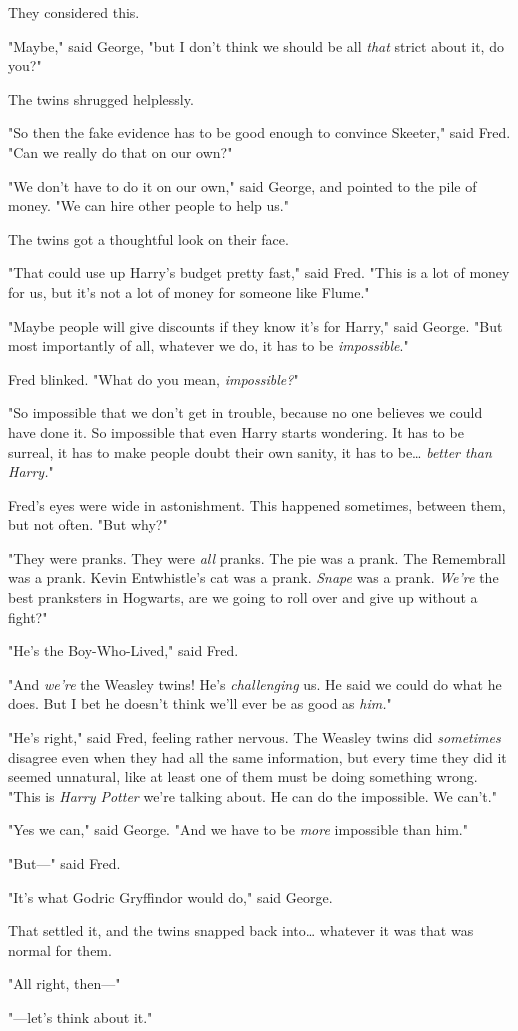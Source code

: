 They considered this.

"Maybe," said George, "but I don't think we should be all \emph{that} strict
about it, do you?"

The twins shrugged helplessly.

"So then the fake evidence has to be good enough to convince Skeeter," said
Fred. "Can we really do that on our own?"

"We don't have to do it on our own," said George, and pointed to the pile of
money. "We can hire other people to help us."

The twins got a thoughtful look on their face.

"That could use up Harry's budget pretty fast," said Fred. "This is a lot of
money for us, but it's not a lot of money for someone like Flume."

"Maybe people will give discounts if they know it's for Harry," said George.
"But most importantly of all, whatever we do, it has to be \emph{impossible}."

Fred blinked. "What do you mean, \emph{impossible?}"

"So impossible that we don't get in trouble, because no one believes we could
have done it. So impossible that even Harry starts wondering. It has to be
surreal, it has to make people doubt their own sanity, it has to be{\ldots}
\emph{better than Harry.}"

Fred's eyes were wide in astonishment. This happened sometimes, between them,
but not often. "But why?"

"They were pranks. They were \emph{all} pranks. The pie was a prank. The
Remembrall was a prank. Kevin Entwhistle's cat was a prank. \emph{Snape} was a
prank. \emph{We're} the best pranksters in Hogwarts, are we going to roll over
and give up without a fight?"

"He's the Boy-Who-Lived," said Fred.

"And \emph{we're} the Weasley twins! He's \emph{challenging} us. He said we
could do what he does. But I bet he doesn't think we'll ever be as good as
\emph{him.}"

"He's right," said Fred, feeling rather nervous. The Weasley twins did
\emph{sometimes} disagree even when they had all the same information, but
every time they did it seemed unnatural, like at least one of them must be
doing something wrong. "This is \emph{Harry Potter} we're talking about. He can
do the impossible. We can't."

"Yes we can," said George. "And we have to be \emph{more} impossible than him."

"But---" said Fred.

"It's what Godric Gryffindor would do," said George.

That settled it, and the twins snapped back into{\ldots} whatever it was that
was normal for them.

"All right, then---"

"---let's think about it."
